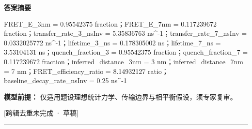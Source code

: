 \documentclass[UTF8,11pt,a4paper]{ctexart}
\begin{document}
\noindent\textbf{答案摘要}\par
FRET\_E\_3nm = 0.95542375 fraction；FRET\_E\_7nm = 0.117239672 fraction；transfer\_rate\_3\_nsInv = 5.35836763 ns\textasciicircum{}-1；transfer\_rate\_7\_nsInv = 0.0332025772 ns\textasciicircum{}-1；lifetime\_3\_ns = 0.178305002 ns；lifetime\_7\_ns = 3.53104131 ns；quench\_fraction\_3 = 0.95542375 fraction；quench\_fraction\_7 = 0.117239672 fraction；inferred\_distance\_3nm = 3 nm；inferred\_distance\_7nm = 7 nm；FRET\_efficiency\_ratio = 8.14932127 ratio；baseline\_decay\_rate\_nsInv = 0.25 ns\textasciicircum{}-1\par
\noindent\textbf{模型前提：}
仅适用题设理想统计力学、传输边界与相平衡假设，须专家复审。\par
\noindent\textcolor{red!65!black}{[跨辑去重未完成 · 草稿]} \par
\medskip\hrule\medskip
{}
\end{document}
